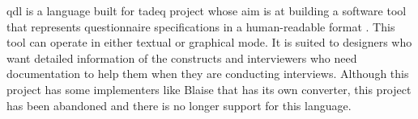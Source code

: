

	\gls{qdl} is a language built for \gls{tadeq} project whose aim is at building a software tool that represents questionnaire specifications in a human-readable format \cite{proc:bethlehem00}. This tool can operate in either textual or graphical mode. It is suited to designers who want detailed information of the constructs and interviewers who need documentation to help them when they are conducting interviews. Although this project has some implementers like Blaise that has its own converter, this project has been abandoned and there is no longer support for this language.




